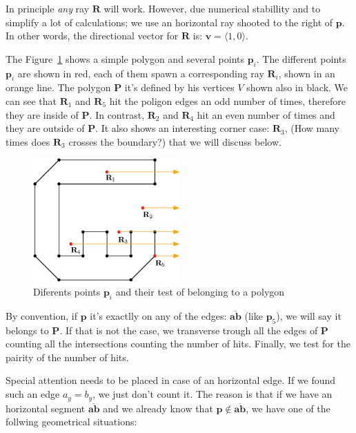 In principle \emph{any} ray $\mathbf{R}$ will work.
However, due numerical stabillity and to simplify a lot of calculations; we use an horizontal ray shooted to the right of $\mathbf{p}$. In other words, the directional vector for $\mathbf{R}$ is: $\mathbf{v} = \langle 1, 0 \rangle$.

The Figure~\ref{fig:polygonTest} shows a simple polygon and several points $\mathbf{p}_i$.
The different points $\mathbf{p}_i$ are shown in red, each of them spawn a corresponding ray $\mathbf{R}_i$, shown in an orange line.
The polygon $\mathbf{P}$ it's defined by his vertices $V$ shown also in black.
We can see that $\mathbf{R}_1$ and $\mathbf{R}_5$ hit the poligon edges an odd number of times, therefore they are inside of $\mathbf{P}$.
In contrast, $\mathbf{R}_2$ and $\mathbf{R}_4$ hit an even number of times and they are outside of $\mathbf{P}$.
It also shows an interesting corner case: $\mathbf{R}_3$, (How many times does $\mathbf{R}_3$ crosses the boundary?) that we will discuss below.

\begin{figure}[htb]
  \centering
  \includegraphics[width=0.50\textwidth]{img/polygonTest}
  \caption{Diferents points $\mathbf{p}_i$ and their test of belonging to a polygon}
  \label{fig:polygonTest}
\end{figure}

By convention, if $\mathbf{p}$ it's exactlly on any of the edges: $\overline{\mathbf{a}\mathbf{b}}$ (like $\mathbf{p}_5$), we will say it belongs to $\mathbf{P}$. If that is not the case, we transverse trough all the edges of $\mathbf{P}$ counting all the intersections counting the number of hits. Finally, we test for the pairity of the number of hits.

Special attention needs to be placed in case of an horizontal edge.
If we found such an edge $a_y = b_y$, we just don't count it.
The reason is that if we have an horizontal segment $\overline{\mathbf{a}\mathbf{b}}$ and we already know that $\mathbf{p} \notin\overline{\mathbf{a}\mathbf{b}}$, we have one of the follwing geometrical situations:

